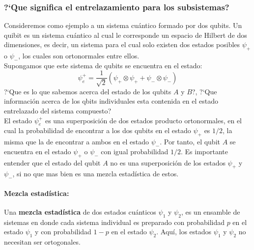 \documentclass[12pt]{book}
\numberwithin{equation}{chapter}
\def\pr{\otimes}
\begin{document}
\subsubsection{?`Que significa el entrelazamiento para los subsistemas?}
Consideremos como ejemplo a un sistema cu\'antico formado por dos qubits. Un quibit es un sistema cu\'antico al cual le corresponde un espacio de Hilbert de dos dimensiones, es decir, un sistema para el cual solo existen dos estados posibles $\psi_{+}$ o $\psi_{-}$, los cuales son ortonormales entre ellos.\\
Supongamos que este sistema de qubits se encuentra en el estado:
\begin{equation}
\psi_{e}^{+}= \frac{1}{\sqrt{2}} ( \psi_{+} \pr \psi_{+} + \psi_{-} \pr \psi_{-} )
\end{equation}
?`Que es lo que sabemos acerca del estado de los qubits $A$ y $B$?, ?`Que informaci\'on acerca de los qbits individuales esta contenida en el estado entrelazado del sistema compuesto? \\
El estado $\psi_{e}^{+}$ es una superposici\'on de dos estados producto ortonormales, en el cual la probabilidad de encontrar a los dos qubits en el estado $\psi_{+}$ es $1/2$, la misma que la de encontrar a ambos en el estado $\psi_{-}$. Por tanto, el qubit $A$ se encuentra en el estado $\psi_{+}$ o $\psi_{-}$ con igual probabilidad $1/2$. Es importante entender que el estado del qubit $A$ no es una superposici\'on de los estados $\psi_{+}$ y $\psi_{-}$, si no que mas bien es una mezcla estad\'istica de estos.

\paragraph{Mezcla estad\'istica:} Una {\bf mezcla estad\'istica} de dos estados cu\'anticos $\psi_{1}$ y $\psi_{2}$, es un ensamble de sistemas en donde cada sistema individual es preparado con probabilidad $p$ en el estado $\psi_{1}$ y con probabilidad $1-p$ en el estado $\psi_{2}$. Aqu\'i, los estados $\psi_{1}$ y $\psi_{2}$ no necesitan ser ortogonales.

\rightline{$\dag$}
\vspace{5 mm}
\end{document}
